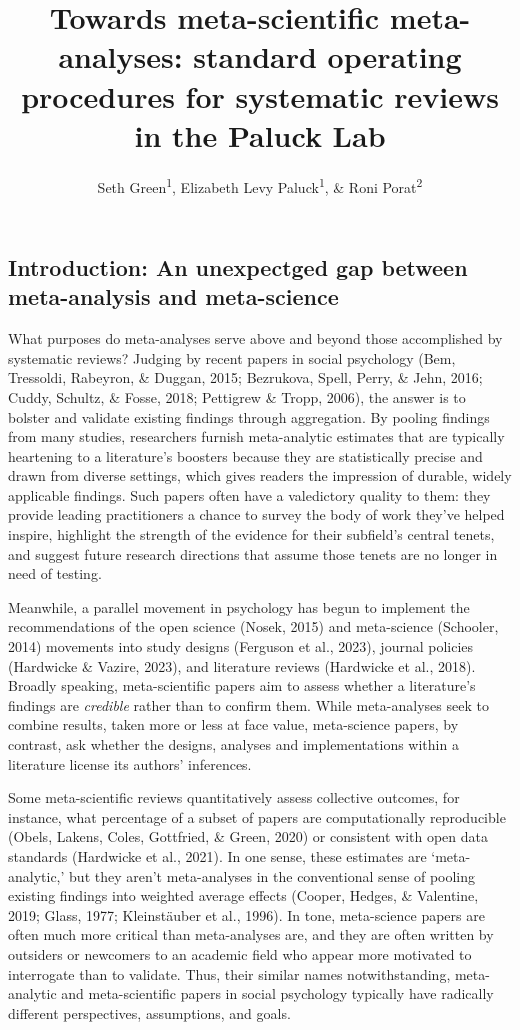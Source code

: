 \documentclass[
  man]{apa6}
\title{Towards meta-scientific meta-analyses: standard operating procedures for systematic reviews in the Paluck Lab}
\author{Seth Green\textsuperscript{1}, Elizabeth Levy Paluck\textsuperscript{1}, \& Roni Porat\textsuperscript{2}}
\date{}
\affiliation{\vspace{0.5cm}\textsuperscript{1} Princeton University\\\textsuperscript{2} Hebrew University, Jerusalem}
\begin{document}
\maketitle

\subsection{Introduction: An unexpectged gap between meta-analysis and meta-science}\label{introduction-an-unexpectged-gap-between-meta-analysis-and-meta-science}

What purposes do meta-analyses serve above and beyond those accomplished by systematic reviews? Judging by recent papers in social psychology (Bem, Tressoldi, Rabeyron, \& Duggan, 2015; Bezrukova, Spell, Perry, \& Jehn, 2016; Cuddy, Schultz, \& Fosse, 2018; Pettigrew \& Tropp, 2006), the answer is to bolster and validate existing findings through aggregation. By pooling findings from many studies, researchers furnish meta-analytic estimates that are typically heartening to a literature's boosters because they are statistically precise and drawn from diverse settings, which gives readers the impression of durable, widely applicable findings. Such papers often have a valedictory quality to them: they provide leading practitioners a chance to survey the body of work they've helped inspire, highlight the strength of the evidence for their subfield's central tenets, and suggest future research directions that assume those tenets are no longer in need of testing.

Meanwhile, a parallel movement in psychology has begun to implement the recommendations of the open science (Nosek, 2015) and meta-science (Schooler, 2014) movements into study designs (Ferguson et al., 2023), journal policies (Hardwicke \& Vazire, 2023), and literature reviews (Hardwicke et al., 2018). Broadly speaking, meta-scientific papers aim to assess whether a literature's findings are \emph{credible} rather than to confirm them. While meta-analyses seek to combine results, taken more or less at face value, meta-science papers, by contrast, ask whether the designs, analyses and implementations within a literature license its authors' inferences.

Some meta-scientific reviews quantitatively assess collective outcomes, for instance, what percentage of a subset of papers are computationally reproducible (Obels, Lakens, Coles, Gottfried, \& Green, 2020) or consistent with open data standards (Hardwicke et al., 2021). In one sense, these estimates are `meta-analytic,' but they aren't meta-analyses in the conventional sense of pooling existing findings into weighted average effects (Cooper, Hedges, \& Valentine, 2019; Glass, 1977; Kleinstäuber et al., 1996). In tone, meta-science papers are often much more critical than meta-analyses are, and they are often written by outsiders or newcomers to an academic field who appear more motivated to interrogate than to validate. Thus, their similar names notwithstanding, meta-analytic and meta-scientific papers in social psychology typically have radically different perspectives, assumptions, and goals.
\end{document}
